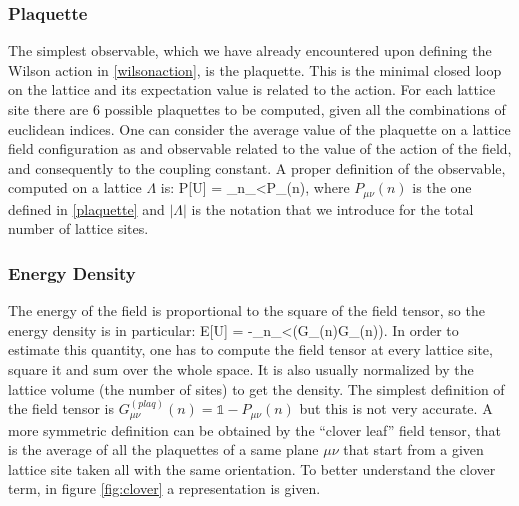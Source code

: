 \subsubsection{Plaquette}
The simplest observable, which we have already encountered upon defining the Wilson action in \cref{wilsonaction}, is the plaquette. This is the minimal closed loop on the lattice and its expectation value is related to the action. For each lattice site there are 6 possible plaquettes to be computed, given all the combinations of euclidean indices. One can consider the average value of the plaquette on a lattice field configuration as and observable related to the value of the action of the field, and consequently to the coupling constant. A proper definition of the observable, computed on a lattice $\Lambda$ is:
\beq
    P[U] = \sum_{n\in\Lambda}\sum_{\mu<\nu}P_{\mu\nu}(n),
\eeq
where $P_{\mu\nu}(n)$ is the one defined in \cref{plaquette} and $|\Lambda|$ is the notation that we introduce for the total number of lattice sites. \\

\subsubsection{Energy Density}
The energy of the field is proportional to the square of the field tensor, so the energy density is in particular:
\beq
    E[U] = -\sum_{n\in\Lambda}\sum_{\mu<\nu}\Tr(G_{\mu\nu}(n)G_{\mu\nu}(n)).
    \label{eq:energy}
\eeq
In order to estimate this quantity, one has to compute the field tensor at every lattice site, square it and sum over the whole space. It is also usually normalized by the lattice volume (the number of sites) to get the density. The simplest definition of the field tensor is $G_{\mu\nu}^{(plaq)}(n) = \mathds{1} - P_{\mu\nu}(n)$ but this is not very accurate. A more symmetric definition can be obtained by the ``clover leaf'' field tensor, that is the average of all the plaquettes of a same plane $\mu\nu$ that start from a given lattice site taken all with the same orientation. To better understand the clover term, in figure \cref{fig:clover} a representation is given.

